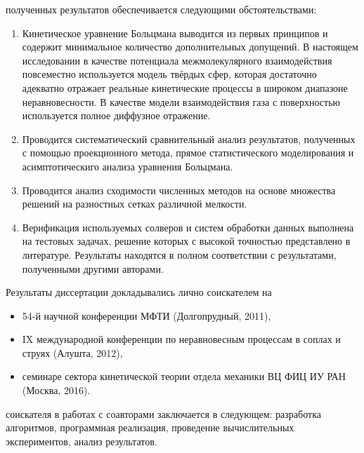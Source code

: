 {\reliability} полученных результатов обеспечивается следующими обстоятельствами:
\begin{enumerate}
    \item Кинетическое уравнение Больцмана выводится из первых принципов и
    содержит минимальное количество дополнительных допущений.
    В настоящем исследовании в качестве потенциала межмолекулярного взаимодействия
    повсеместно используется модель твёрдых сфер,
    которая достаточно адекватно отражает реальные кинетические процессы в широком диапазоне неравновесности.
    В качестве модели взаимодействия газа с поверхностью используется полное диффузное отражение.
    \item Проводится систематический сравнительный анализ результатов,
    полученных с помощью проекционного метода, прямое статистического моделирования
    и асимптотическиго анализа уравнения Больцмана.
    \item Проводится анализ сходимости численных методов на основе
    множества решений на разностных сетках различной мелкости.
    \item Верификация используемых солверов и систем обработки данных
    выполнена на тестовых задачах, решение которых с высокой точностью представлено в литературе.
    Результаты находятся в полном соответствии с результатами, полученными другими авторами.
\end{enumerate}

{\probation} Результаты диссертации докладывались лично соискателем на
\begin{itemize}
    \item 54-й научной конференции МФТИ (Долгопрудный, 2011),
    \item IX международной конференции по неравновесным процессам в соплах и струях (Алушта, 2012),
    \item семинаре сектора кинетической теории отдела механики ВЦ ФИЦ ИУ РАН (Москва, 2016).
\end{itemize}

{\contribution} соискателя в работах с соавторами заключается в следующем:
разработка алгоритмов, программная реализация, проведение вычислительных экспериментов, анализ результатов.

